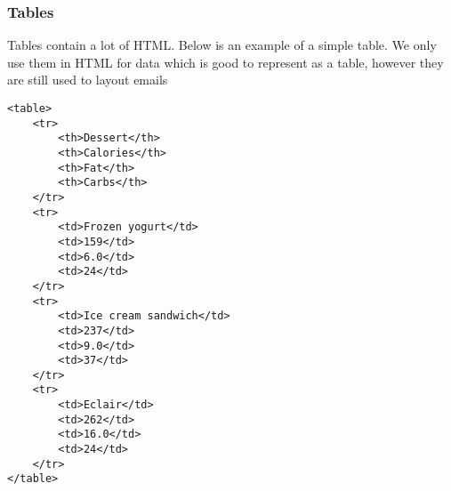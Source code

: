 \subsubsection{Tables}

Tables contain a lot of HTML. Below is an example of a simple table. We only use them in HTML for data which is good to represent as a table, however they are still used to layout emails

\begin{verbatim}
<table>
    <tr>
        <th>Dessert</th>
        <th>Calories</th>
        <th>Fat</th>
        <th>Carbs</th>
    </tr>
    <tr>
        <td>Frozen yogurt</td>
        <td>159</td>
        <td>6.0</td>
        <td>24</td>
    </tr>
    <tr>
        <td>Ice cream sandwich</td>
        <td>237</td>
        <td>9.0</td>
        <td>37</td>
    </tr>
    <tr>
        <td>Eclair</td>
        <td>262</td>
        <td>16.0</td>
        <td>24</td>
    </tr>
</table>
\end{verbatim}
